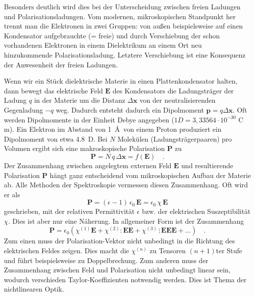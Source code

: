 Besonders deutlich wird dies bei der Unterscheidung zwischen freien Ladungen und Polarisationsladungen.  Vom modernen, mikroskopischen Standpunkt her trennt man die Elektronen in zwei Gruppen: von außen beispielsweise auf einen Kondensator aufgebrauchte (= freie) und durch Verschiebung der schon vorhandenen Elektronen in einem Dielektrikum an einem Ort neu hinzukommende Polarisationsladung. Letztere Verschiebung ist eine Konsequenz der Anwesenheit der freien Ladungen.

Wenn wir ein Stück dielektrische Materie in einen Plattenkondensator halten, dann bewegt das elektrische Feld $\mathbf{E}$ des Kondensators die Ladungsträger der Ladung $q$ in der Materie um  die Distanz $\Delta  \mathbf{x}$ von der neutralisierenden Gegenladung $-q$ weg. Dadurch entsteht dadurch ein Dipolmoment $\mathbf{p} = q \Delta \mathbf{x}$. Oft werden Dipolmomente in der Einheit Debye angegeben ($1 D = 3{,}33564 \cdot 10^{-30}$ C  m). Ein Elektron im Abstand von 1~\AA\ von einem Proton produziert ein Dipolmoment von etwa 4.8~D. Bei $N$ Molekülen (Ladungsträgerpaaren) pro Volumen ergibt sich eine makroskopische Polarisation $\mathbf{P}$ zu
\begin{equation}
\mathbf{P} = N \, q \, \Delta \mathbf{x} = f(\mathbf{E}) \quad .
\end{equation}
Der Zusammenhang zwischen angelegtem externen Feld $\mathbf{E}$ und resultierende 
Polarisation $\mathbf{P}$ hängt ganz entscheidend vom mikroskopischen Aufbau der Materie ab. Alle Methoden der Spektroskopie vermessen diesen Zusammenhang. Oft wird er als 
\begin{equation}
 \mathbf{P} =  (\epsilon - 1) \, \epsilon_0 \, \mathbf{E} = \epsilon_0 \,\chi \, \mathbf{E} 
 \label{eq:diel_p_lin}
\end{equation}
geschrieben, mit der relativen Permittivität $\epsilon$ bzw. der elektrischen Suszeptibilität $\chi$. Dies ist aber nur eine Näherung. In allgemeiner Form ist der Zusammenhang
\begin{equation}
\mathbf{P}  = \epsilon_0 \left( \chi^{(1)} \mathbf{E} + \chi^{(2)} : \mathbf{E}  \mathbf{E} +  \chi^{(3)} \, \vdots  \, \mathbf{E}  \mathbf{E}  \mathbf{E}  + \dots \right) \quad .
\end{equation}
Zum einen muss der Polarisation-Vektor nicht unbedingt in die Richtung des elektrischen Feldes zeigen. Dies macht die $\chi^{(n)}$ zu Tensoren $(n+1)$ter Stufe und führt beispielsweise zu Doppelbrechung. Zum anderen muss der Zusammenhang zwischen Feld und Polarisation nicht unbedingt linear sein, wodurch verschieden Taylor-Koeffizienten notwendig werden. Dies ist Thema der nichtlinearen Optik.

